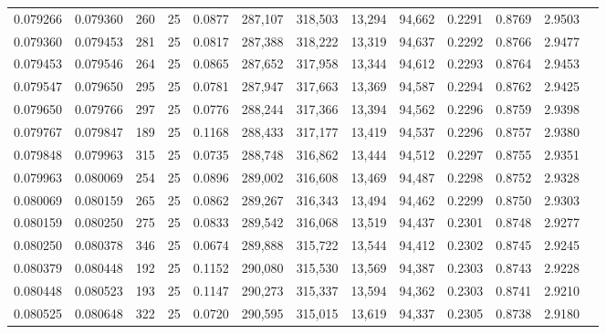 \begin{tabular}{rrrrrrrrrrrrr}
0.079266 & 0.079360 &   260 &  25 &                                     0.0877 & 287,107 & 318,503 &  13,294 &  94,662 & 0.2291 & 0.8769 & 2.9503 \\
0.079360 & 0.079453 &   281 &  25 &                                     0.0817 & 287,388 & 318,222 &  13,319 &  94,637 & 0.2292 & 0.8766 & 2.9477 \\
0.079453 & 0.079546 &   264 &  25 &                                     0.0865 & 287,652 & 317,958 &  13,344 &  94,612 & 0.2293 & 0.8764 & 2.9453 \\
0.079547 & 0.079650 &   295 &  25 &                                     0.0781 & 287,947 & 317,663 &  13,369 &  94,587 & 0.2294 & 0.8762 & 2.9425 \\
0.079650 & 0.079766 &   297 &  25 &                                     0.0776 & 288,244 & 317,366 &  13,394 &  94,562 & 0.2296 & 0.8759 & 2.9398 \\
0.079767 & 0.079847 &   189 &  25 &                                     0.1168 & 288,433 & 317,177 &  13,419 &  94,537 & 0.2296 & 0.8757 & 2.9380 \\
0.079848 & 0.079963 &   315 &  25 &                                     0.0735 & 288,748 & 316,862 &  13,444 &  94,512 & 0.2297 & 0.8755 & 2.9351 \\
0.079963 & 0.080069 &   254 &  25 &                                     0.0896 & 289,002 & 316,608 &  13,469 &  94,487 & 0.2298 & 0.8752 & 2.9328 \\
0.080069 & 0.080159 &   265 &  25 &                                     0.0862 & 289,267 & 316,343 &  13,494 &  94,462 & 0.2299 & 0.8750 & 2.9303 \\
0.080159 & 0.080250 &   275 &  25 &                                     0.0833 & 289,542 & 316,068 &  13,519 &  94,437 & 0.2301 & 0.8748 & 2.9277 \\
0.080250 & 0.080378 &   346 &  25 &                                     0.0674 & 289,888 & 315,722 &  13,544 &  94,412 & 0.2302 & 0.8745 & 2.9245 \\
0.080379 & 0.080448 &   192 &  25 &                                     0.1152 & 290,080 & 315,530 &  13,569 &  94,387 & 0.2303 & 0.8743 & 2.9228 \\
0.080448 & 0.080523 &   193 &  25 &                                     0.1147 & 290,273 & 315,337 &  13,594 &  94,362 & 0.2303 & 0.8741 & 2.9210 \\
0.080525 & 0.080648 &   322 &  25 &                                     0.0720 & 290,595 & 315,015 &  13,619 &  94,337 & 0.2305 & 0.8738 & 2.9180 \\

\end{tabular}
